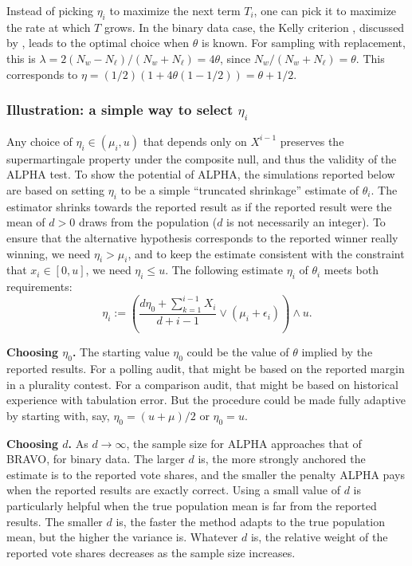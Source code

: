 \documentclass[aoas]{imsart}
\begin{document}
Instead of picking $\eta_i$ to maximize the next term $T_i$, one can pick it to maximize the rate at which $T$ grows.
In the binary data case, the Kelly criterion \citep{kelly56}, discussed by \citet{waudby-smithRamdas21}, leads to the
optimal choice when $\theta$ is known.
For sampling with replacement, this is $\lambda = 2(N_w-N_\ell)/(N_w+N_\ell) = 4\theta$, since $N_w/(N_w+N_\ell) = \theta$.
This corresponds to $\eta =  (1/2) \left ( 1 + 4\theta  (1-1/2) \right ) = \theta+1/2$. 

\subsubsection{Illustration: a simple way to select $\eta_i$}
Any choice of $\eta_i \in (\mu_i, u)$ that depends only on $X^{i-1}$ preserves the supermartingale property
under the composite null, and thus
the validity of the ALPHA test.
To show the potential of ALPHA, the simulations reported below are based on setting $\eta_i$ to be a simple 
``truncated shrinkage'' estimate of $\theta_i$.
The estimator shrinks towards the reported result as if the reported
result were the mean of 
$d>0$ draws from the population ($d$ is not necessarily an integer). 
To ensure that the alternative hypothesis corresponds to the reported
winner really winning, we need $\eta_i > \mu_i$, and to keep the estimate consistent with the
constraint that $x_i \in [0, u]$, we need $\eta_i \le u$.
The following estimate $\eta_i$ of $\theta_i$ meets both requirements:
\begin{equation} \label{eq:etaDef}
\eta_i :=  \left ( \frac{d\eta_0 + \sum_{k=1}^{i-1}X_i }{d+i-1} \vee (\mu_i+\epsilon_i ) \right )
\wedge u.
\end{equation}

{\bf Choosing $\eta_0$.}
The starting value $\eta_0$ could be the value of $\theta$ implied by the reported results.
For a polling audit, that might be based on the reported margin in a plurality contest.
For a comparison audit, that might be based on historical experience with tabulation error.
But the procedure could be made fully adaptive by starting with,
say, $\eta_0 = (u+\mu)/2$ or $\eta_0 = u$.

{\bf Choosing $d$.}
As $d \rightarrow \infty$, the sample size for ALPHA approaches that of BRAVO, for binary data.
The larger $d$ is, the more strongly anchored the estimate is to the reported vote shares, and
the smaller the penalty ALPHA pays when the reported results are exactly correct.
Using a small value of $d$ is particularly helpful when the true population mean is far from the reported results.
The smaller $d$ is, the faster the method adapts to the true population mean, but the higher the variance is.
Whatever $d$ is, the relative weight of the reported vote shares decreases as the sample size increases.
\end{document}
